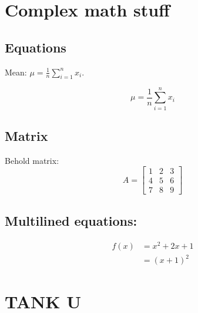 \documentclass[12pt,a4paper]{article}
\begin{document}
\section{Complex math stuff}

\subsection{Equations}
Mean: $\mu = \frac{1}{n}\sum_{i=1}^{n}x_i$.

{}
\begin{equation}
    \mu = \frac{1}{n}\sum_{i=1}^{n}x_i
    \label{eq:mean}
\end{equation}

\subsection{Matrix}

Behold matrix:
\begin{equation}
    A =
    \begin{bmatrix}
        1 & 2 & 3 \\
        4 & 5 & 6 \\
        7 & 8 & 9
    \end{bmatrix}
    \label{eq:matrix}
\end{equation}

\subsection{Multilined equations:}
\begin{equation}
    \begin{aligned}
        f(x) &= x^2 + 2x + 1 \\
             &= (x+1)^2
    \end{aligned}
    \label{eq:derivation}
\end{equation} 

\section*{TANK U}
\end{document}
